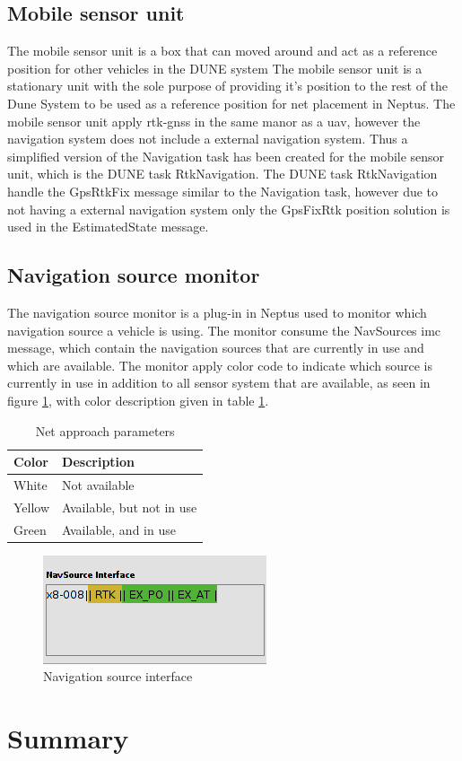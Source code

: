 \subsection{Mobile sensor unit}
The mobile sensor unit is a box that can moved around and act as a reference position for other vehicles in the DUNE system 
The mobile sensor unit is a stationary unit with the sole purpose of providing it's position to the rest of the Dune System to be used as a reference position for net placement in Neptus. The mobile sensor unit apply \gls{rtk-gnss} in the same manor as a \gls{uav}, however the navigation system does not include a external navigation system. Thus a simplified version of the Navigation task has been created for the mobile sensor unit, which is the DUNE task RtkNavigation. The DUNE task RtkNavigation handle the GpsRtkFix message similar to the Navigation task, however due to not having a external navigation system only the GpsFixRtk position solution is used in the EstimatedState message.
\subsection{Navigation source monitor}
The navigation source monitor is a plug-in in Neptus used to monitor which navigation source a vehicle is using. The monitor consume the NavSources \gls{imc} message, which contain the navigation sources that are currently in use and which are available. The monitor apply color code to indicate which source is currently in use in addition to all sensor system that are available, as seen in figure \ref{Fig:NavsourceInterface}, with color description given in table \ref{Tb:Color Code}.
\begin{table}[H]
\begin{center}
    \begin{tabular}{ | l | l |}
    \hline
    \textbf{Color} & \textbf{Description} \\ \hline
    White & Not available \\ \hline
    Yellow & Available, but not in use \\ \hline
    Green & Available, and in use \\ \hline
    \end{tabular}
\end{center}
\caption{Net approach parameters }
\label{Tb:Color Code}
\end{table}
\begin{figure}[H]
\centering
\includegraphics[scale=0.6]{figs/NavSourceInterface.png}
\caption{Navigation source interface}
\label{Fig:NavsourceInterface}
\end{figure}
\section{Summary}